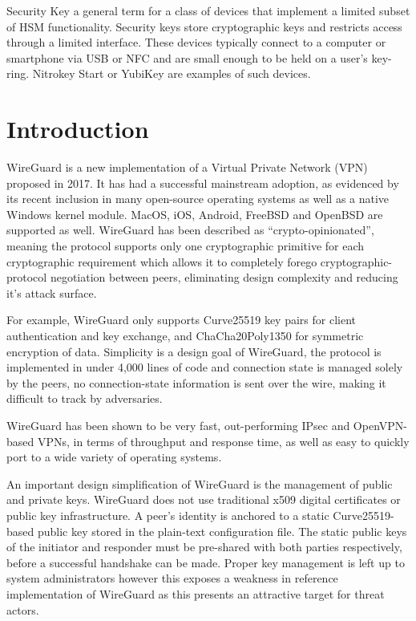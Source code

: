 \documentclass [11pt, proquest] {uwthesis}[2020/02/24]
\begin{document}
\begin{glossary}
\item[Security Key]
a general term for a class of devices that implement a limited subset of HSM functionality. Security keys store cryptographic keys and restricts access through a limited interface. These devices typically connect to a computer or smartphone via USB or NFC and are small enough to be held on a user's key-ring.
Nitrokey Start\cite{noauthor_nitrokey_nodate} or YubiKey\cite{noauthor_discover_nodate}\cite{noauthor_u2f_nodate-1} are examples of such devices.

\end{glossary}

\textpages

\chapter {Introduction} \label{introduction}

WireGuard is a new implementation of a Virtual Private Network (VPN) proposed in 2017. It has had a successful mainstream adoption, as evidenced by its recent inclusion in many open-source operating systems\cite{donenfeld_wireguard_nodate} as well as a native Windows kernel module\cite{noauthor_wireguard-nt_nodate}. MacOS, iOS, Android, FreeBSD and OpenBSD are supported as well.
WireGuard has been described as “crypto-opinionated”, meaning the protocol supports only one cryptographic primitive for each cryptographic requirement which allows it to completely forego cryptographic-protocol negotiation between peers, eliminating design complexity and reducing it's attack surface. 

For example, WireGuard only supports Curve25519 key pairs for client authentication and key exchange, and ChaCha20Poly1350 for symmetric 
encryption\cite{donenfeld_wireguard_2017} of data.
Simplicity is a design goal of WireGuard, the protocol is implemented in under 4,000 lines of code and connection state is managed solely by the peers, no connection-state information is sent over the wire, making it difficult to track by adversaries.

WireGuard has been shown to be very fast, out-performing IPsec and OpenVPN-based VPNs, in terms of throughput and response time\cite{donenfeld_performance_2018}, as well as easy to quickly port to a wide variety of operating systems. 

An important design simplification of WireGuard is the management of public and private keys. WireGuard does not use traditional x509 digital certificates or public key infrastructure. A peer's identity is anchored to a static Curve25519-based public key stored in the plain-text configuration file.
The static public keys of the initiator and responder must be pre-shared with both parties respectively, before a successful handshake can be made. 
Proper key management is left up to system administrators however this exposes a weakness in reference implementation of WireGuard as this presents an attractive target for threat actors.
\end{document}
